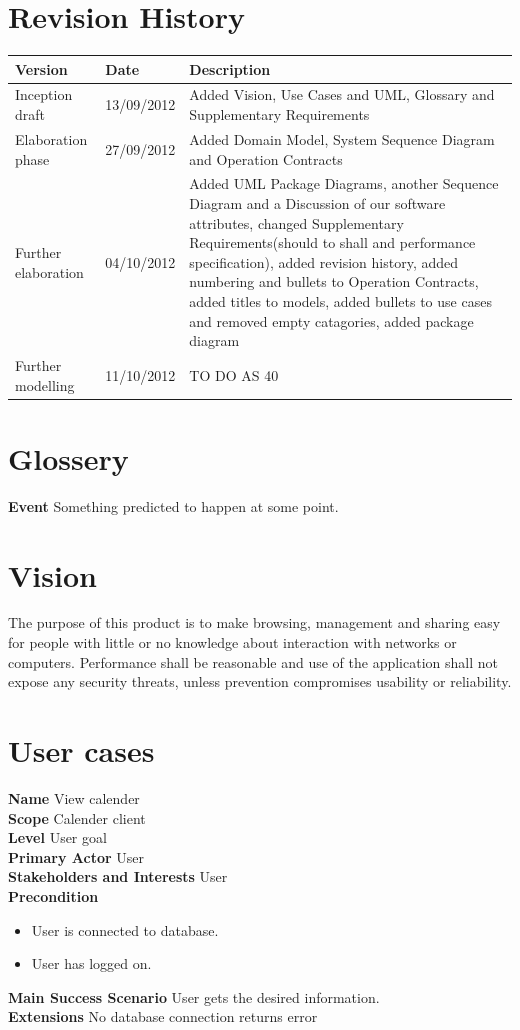 \documentclass[a4paper,10pt,titlepage]{article}
\begin{document}
\section{Revision History}

\begin{center}
    \begin{tabular}{ | l | l | p{7cm}  | }
    \hline
    Version & Date & Description \\ \hline
    Inception draft & 13/09/2012 & Added Vision, Use Cases and UML, Glossary and Supplementary Requirements	\\ \hline
    Elaboration phase & 27/09/2012 & Added Domain Model, System Sequence Diagram and Operation Contracts\\ \hline
    Further elaboration & 04/10/2012 & Added UML Package Diagrams, another Sequence Diagram and a Discussion of our software attributes, changed Supplementary Requirements(should to shall and performance specification), added revision history, added numbering and bullets to Operation Contracts, added titles to models, added bullets to use cases and removed empty catagories, added package diagram \\ \hline
    Further modelling & 11/10/2012 & TO DO AS 40	\\ \hline
    \end{tabular}
\end{center}

\section{Glossery}
	\textbf{Event}
	Something predicted to happen at some point.
	
\section{Vision}
	The purpose of this product is to make browsing, management and sharing easy for people with little or no knowledge about interaction with networks or computers. Performance shall be reasonable and use of the application shall not expose any security threats, unless prevention compromises usability or reliability.
	
\section{User cases}
	\textbf{Name}
	View calender
	\\
	\textbf{Scope}
	Calender client
	\\
	\textbf{Level}
	User goal
	\\
	\textbf{Primary Actor}
	User
	\\
	\textbf{Stakeholders and Interests}
	User
	\\
	\textbf{Precondition}
		\begin{itemize}
		\item User is connected to database.
		\item User has logged on.
		\end{itemize}
	\textbf{Main Success Scenario}
	User gets the desired information.
	\\
	\textbf{Extensions}
	No database connection returns error
	\\
	
\end{document}
